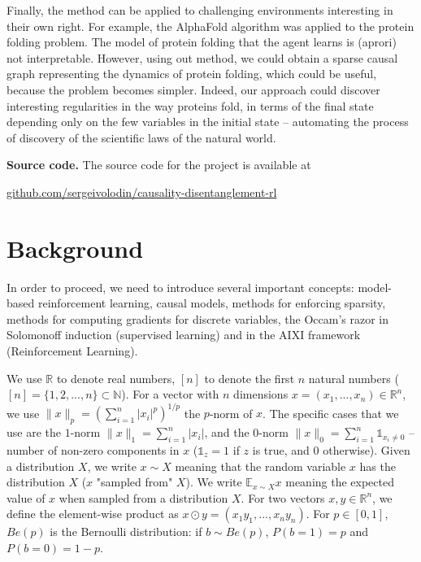\documentclass[a4paper,11pt,oneside]{report}
\begin{document}
Finally, the method can be applied to challenging environments interesting in their own right. For example, the AlphaFold algorithm was applied to the protein folding problem. The model of protein folding that the agent learns is (aprori) not interpretable. However, using out method, we could obtain a sparse causal graph representing the dynamics of protein folding, which could be useful, because the problem becomes simpler. Indeed, our approach could discover interesting regularities in the way proteins fold, in terms of the final state depending only on the few variables in the initial state -- automating the process of discovery of the scientific laws of the natural world.

{\bf Source code.} The source code for the project is available at
\begin{center}
\href{https://github.com/sergeivolodin/causality-disentanglement-rl}{github.com/sergeivolodin/causality-disentanglement-rl}
\end{center}

\chapter{Background}
\label{ch:background}

In order to proceed, we need to introduce several important concepts: model-based reinforcement learning, causal models, methods for enforcing sparsity, methods for computing gradients for discrete variables, the Occam's razor in Solomonoff induction (supervised learning) and in the AIXI framework (Reinforcement Learning).

We use $\mathbb R$ to denote real numbers, $[n]$ to denote the first $n$ natural numbers ($[n]=\{1, 2, ..., n\}\subset \mathbb N$). For a vector with $n$ dimensions $x=(x_1,...,x_n)\in \mathbb R^n$, we use $\|x\|_p=\left(\sum_{i=1}^n|x_i|^p\right)^{1/p}$ the $p$-norm of $x$. The specific cases that we use are the $1$-norm $\|x\|_1=\sum\limits_{i=1}^n|x_i|$, and the $0$-norm $\|x\|_0=\sum\limits_{i=1}^n\mathds 1_{x_i\neq 0}$ -- number of non-zero components in $x$ ($\mathds 1_z=1$ if $z$ is true, and $0$ otherwise).
Given a distribution $X$, we write $x\sim X$ meaning that the random variable $x$ has the distribution $X$ ($x$ "sampled from" $X$). We write $\mathbb E_{x\sim X} x$ meaning the expected value of $x$ when sampled from a distribution $X$. For two vectors $x,y\in\mathbb R^{n}$, we define the element-wise product as $x\odot y=(x_1y_1,...,x_ny_n)$. For $p\in[0,1]$, $Be(p)$ is the Bernoulli distribution: if $b\sim Be(p)$, $P(b=1)=p$ and $P(b=0)=1-p$.
\end{document}
